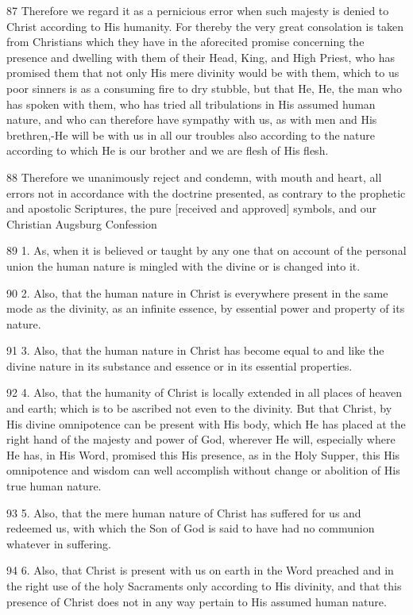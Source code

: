 {87 Therefore we regard it as a pernicious error when such majesty is denied to Christ according to His humanity. For thereby the very great consolation is taken from Christians which they have in the aforecited promise concerning the presence and dwelling with them of their Head, King, and High Priest, who has promised them that not only His mere divinity would be with them, which to us poor sinners is as a consuming fire to dry stubble, but that He, He, the man who has spoken with them, who has tried all tribulations in His assumed human nature, and who can therefore have sympathy with us, as with men and His brethren,-He will be with us in all our troubles also according to the nature according to which He is our brother and we are flesh of His flesh.

88 Therefore we unanimously reject and condemn, with mouth and heart, all errors not in accordance with the doctrine presented, as contrary to the prophetic and apostolic Scriptures, the pure [received and approved] symbols, and our Christian Augsburg Confession

89 1. As, when it is believed or taught by any one that on account of the personal union the human nature is mingled with the divine or is changed into it.

90 2. Also, that the human nature in Christ is everywhere present in the same mode as the divinity, as an infinite essence, by essential power and property of its nature.

91 3. Also, that the human nature in Christ has become equal to and like the divine nature in its substance and essence or in its essential properties.

92 4. Also, that the humanity of Christ is locally extended in all places of heaven and earth; which is to be ascribed not even to the divinity. But that Christ, by His divine omnipotence can be present with His body, which He has placed at the right hand of the majesty and power of God, wherever He will, especially where He has, in His Word, promised this His presence, as in the Holy Supper, this His omnipotence and wisdom can well accomplish without change or abolition of His true human nature.

93 5. Also, that the mere human nature of Christ has suffered for us and redeemed us, with which the Son of God is said to have had no communion whatever in suffering.

94 6. Also, that Christ is present with us on earth in the Word preached and in the right use of the holy Sacraments only according to His divinity, and that this presence of Christ does not in any way pertain to His assumed human nature.

}
